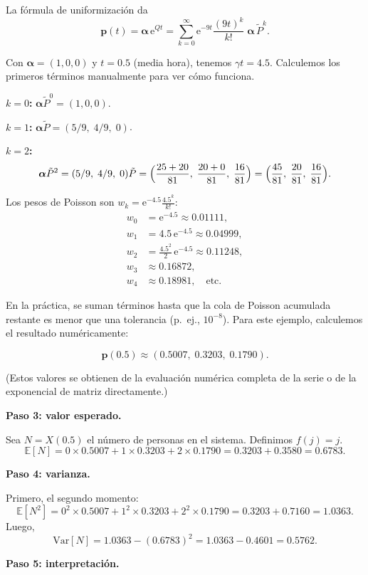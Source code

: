 \documentclass[11pt,a4paper]{article}
\theoremstyle{definition}
\theoremstyle{remark}
\newcommand{\E}{\mathbb{E}}
\newcommand{\Var}{\mathrm{Var}}
\newcommand{\e}{\mathrm{e}}
\begin{document}
\begin{ejemplo}
La fórmula de uniformización da
\[
  \boldsymbol{p}(t) = \boldsymbol{\alpha}\,\e^{Qt}
  = \sum_{k=0}^{\infty}\e^{-9t}\frac{(9t)^k}{k!}
    \;\boldsymbol{\alpha}\,\tilde{P}^k.
\]

Con $\boldsymbol{\alpha}=(1,0,0)$ y $t=0.5$ (media hora), tenemos
$\gamma t = 4.5$.  Calculemos los primeros términos manualmente para
ver cómo funciona.

\textbf{$k=0$:}
$\boldsymbol{\alpha}\tilde{P}^0 = (1,0,0)$.

\textbf{$k=1$:}
$\boldsymbol{\alpha}\tilde{P} = (5/9,\;4/9,\;0)$.

\textbf{$k=2$:}
\[
  \boldsymbol{\alpha}\tilde{P}^2
  = (5/9,\;4/9,\;0)\tilde{P}
  = \Bigl(\frac{25+20}{81},\;\frac{20+0}{81},\;\frac{16}{81}\Bigr)
  = \Bigl(\frac{45}{81},\;\frac{20}{81},\;\frac{16}{81}\Bigr).
\]

Los pesos de Poisson son $w_k = \e^{-4.5}\frac{4.5^k}{k!}$:
\begin{align*}
  w_0 &= \e^{-4.5} \approx 0.01111, \\
  w_1 &= 4.5\,\e^{-4.5} \approx 0.04999, \\
  w_2 &= \frac{4.5^2}{2}\,\e^{-4.5} \approx 0.11248, \\
  w_3 &\approx 0.16872, \\
  w_4 &\approx 0.18981, \quad\text{etc.}
\end{align*}

En la práctica, se suman términos hasta que la cola de Poisson acumulada
restante es menor que una tolerancia (p.~ej., $10^{-8}$).  Para este
ejemplo, calculemos el resultado numéricamente:

\[
  \boldsymbol{p}(0.5) \approx (0.5007,\;0.3203,\;0.1790).
\]

(Estos valores se obtienen de la evaluación numérica completa de la serie
o de la exponencial de matriz directamente.)

\textbf{Paso 3: valor esperado.}

Sea $N = X(0.5)$ el número de personas en el sistema.  Definimos
$f(j)=j$.
\[
  \E[N] = 0 \times 0.5007 + 1 \times 0.3203 + 2 \times 0.1790
  = 0.3203 + 0.3580 = 0.6783.
\]

\textbf{Paso 4: varianza.}

Primero, el segundo momento:
\[
  \E[N^2] = 0^2\times 0.5007 + 1^2\times 0.3203 + 2^2\times 0.1790
  = 0.3203 + 0.7160 = 1.0363.
\]
Luego,
\[
  \Var[N] = 1.0363 - (0.6783)^2 = 1.0363 - 0.4601 = 0.5762.
\]

\textbf{Paso 5: interpretación.}


\end{ejemplo}
\end{document}
